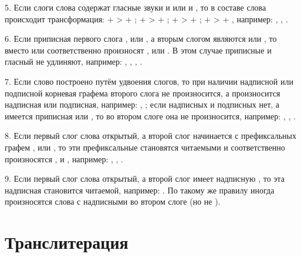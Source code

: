 5. Если слоги слова содержат гласные звуки  и  или  и , то в составе слова происходит трансформация:  +  >  + ;  +  >  + ;  +  >  + ;  +  >  + , например: , , .

6. Если приписная первого слога ,  или , а вторым слогом являются  или , то вместо  или  соответственно произносят ,  или . В этом случае приписные  и гласный не удлиняют, например:
,
,
,
.

7. Если слово построено путём удвоения слогов, то при наличии надписной или подписной корневая графема второго слога не произносится, а произносится надписная или подписная, например:
, ;
если надписных и подписных нет, а имеется приписная  или , то во втором слоге она не произносится, например:
,
,
.

8. Если первый слог слова открытый, а второй слог начинается с префиксальных графем ,  или , то эти префиксальные становятся читаемыми и соответственно произносятся ,  и , например:
,
,
.

9. Если первый слог слова открытый, а второй слог имеет надписную , то эта надписная становится читаемой, например: . По такому же правилу иногда произносятся слова с надписными  во втором слоге (но не ).

\section{Транслитерация}

